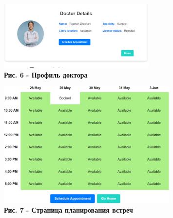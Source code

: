 \begin{figure}[]
	\centering
	\includegraphics[width=0.7\textwidth]{assets/156}
	\caption*{\bfseries Рис. 6 - Профиль доктора}
\end{figure}

\begin{figure}[H]
	\centering
	\includegraphics[width=0.8\textwidth]{assets/157}
	\caption*{\bfseries Рис. 7 - Страница планирования встреч}
\end{figure}
